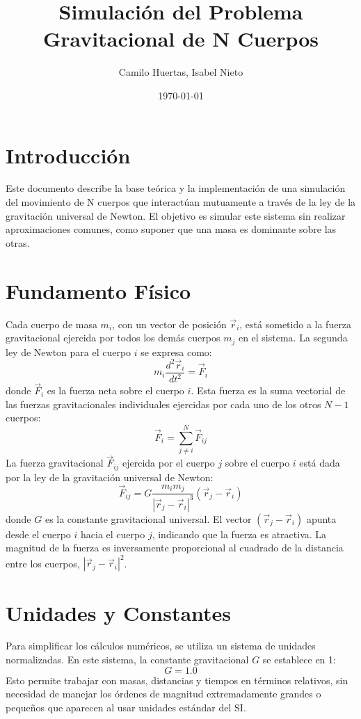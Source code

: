 \documentclass{article}
\title{Simulación del Problema Gravitacional de N Cuerpos}
\author{Camilo Huertas, Isabel Nieto}
\date{\today}
\begin{document}
\maketitle

\section{Introducción}
Este documento describe la base teórica y la implementación de una simulación del movimiento de N cuerpos que interactúan mutuamente a través de la ley de la gravitación universal de Newton. El objetivo es simular este sistema sin realizar aproximaciones comunes, como suponer que una masa es dominante sobre las otras.

\section{Fundamento Físico}
Cada cuerpo de masa $m_i$, con un vector de posición $\vec{r}_i$, está sometido a la fuerza gravitacional ejercida por todos los demás cuerpos $m_j$ en el sistema. La segunda ley de Newton para el cuerpo $i$ se expresa como:
\begin{equation}
m_i \frac{d^2\vec{r}_i}{dt^2} = \vec{F}_i
\end{equation}
donde $\vec{F}_i$ es la fuerza neta sobre el cuerpo $i$. Esta fuerza es la suma vectorial de las fuerzas gravitacionales individuales ejercidas por cada uno de los otros $N-1$ cuerpos:
\begin{equation}
\vec{F}_i = \sum_{j \neq i}^{N} \vec{F}_{ij}
\end{equation}
La fuerza gravitacional $\vec{F}_{ij}$ ejercida por el cuerpo $j$ sobre el cuerpo $i$ está dada por la ley de la gravitación universal de Newton:
\begin{equation}
\vec{F}_{ij} = G \frac{m_i m_j}{|\vec{r}_j - \vec{r}_i|^3} (\vec{r}_j - \vec{r}_i)
\label{eq:fuerza_grav}
\end{equation}
donde $G$ es la constante gravitacional universal. El vector $(\vec{r}_j - \vec{r}_i)$ apunta desde el cuerpo $i$ hacia el cuerpo $j$, indicando que la fuerza es atractiva. La magnitud de la fuerza es inversamente proporcional al cuadrado de la distancia entre los cuerpos, $|\vec{r}_j - \vec{r}_i|^2$.

\section{Unidades y Constantes}
Para simplificar los cálculos numéricos, se utiliza un sistema de unidades normalizadas. En este sistema, la constante gravitacional $G$ se establece en 1:
\begin{equation}
G = 1.0
\end{equation}
Esto permite trabajar con masas, distancias y tiempos en términos relativos, sin necesidad de manejar los órdenes de magnitud extremadamente grandes o pequeños que aparecen al usar unidades estándar del SI.
\end{document}
